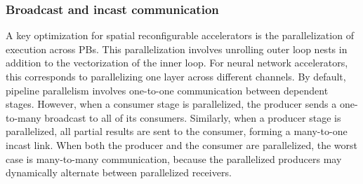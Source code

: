 \subsubsection{Broadcast and incast communication} 
A key optimization for spatial reconfigurable accelerators is the parallelization of execution across PBs.
This parallelization involves unrolling outer loop nests in addition to the vectorization of the inner loop.
For neural network accelerators, this corresponds to parallelizing one layer across different channels. 
By default, pipeline parallelism involves one-to-one communication between dependent stages.
However, when a consumer stage is parallelized, the producer sends a one-to-many broadcast to all of its consumers.
Similarly, when a producer stage is parallelized, all partial results are sent to the consumer, forming a many-to-one incast link. 
When both the producer and the consumer are parallelized, 
the worst case is many-to-many communication, because the parallelized producers may dynamically alternate between parallelized receivers. 
